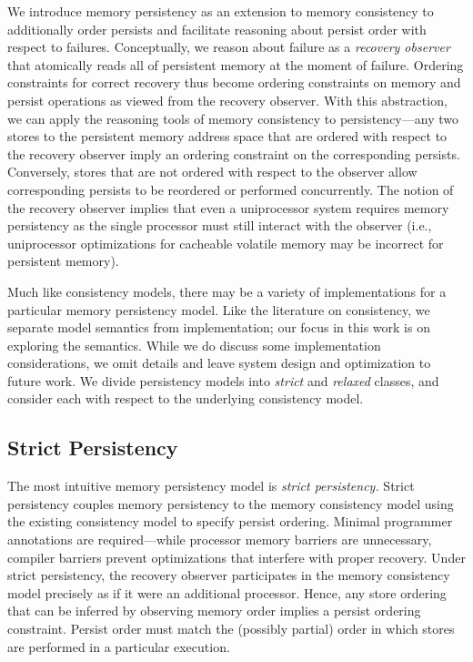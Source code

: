 We introduce memory persistency as an extension to memory consistency to additionally order persists and facilitate reasoning about persist order with respect to failures.
Conceptually, we reason about failure as a \emph{recovery observer} that atomically reads all of persistent memory at the moment of failure.
Ordering constraints for correct recovery thus become ordering constraints on memory and persist operations as viewed from the recovery observer.
With this abstraction, we can apply the reasoning tools of memory consistency to persistency---any two stores to the persistent memory address space that are ordered with respect to the recovery observer imply an ordering constraint on the corresponding persists.
Conversely, stores that are not ordered with respect to the observer allow corresponding persists to be reordered or performed concurrently.
The notion of the recovery observer implies that even a uniprocessor system requires memory persistency as the single processor must still interact with the observer (i.e., uniprocessor optimizations for cacheable volatile memory may be incorrect for persistent memory).

Much like consistency models, there may be a variety of implementations for a particular memory persistency model.
Like the literature on consistency, we separate model semantics from implementation; our focus in this work is on exploring the semantics.
While we do discuss some implementation considerations, we omit details and leave system design and optimization to future work.
We divide persistency models into \emph{strict} and \emph{relaxed} classes, and consider each with respect to the underlying consistency model.

\subsection{Strict Persistency}

The most intuitive memory persistency model is \emph{strict persistency.}
Strict persistency couples memory persistency to the memory consistency model using the existing consistency model to specify persist ordering.
Minimal programmer annotations are required---while processor memory barriers are unnecessary, compiler barriers prevent optimizations that interfere with proper recovery.
Under strict persistency, the recovery observer participates in the memory consistency model precisely as if it were an additional processor.  
Hence, any store ordering that can be inferred by observing memory order implies a persist ordering constraint.
Persist order must match the (possibly partial) order in which stores are performed in a particular execution.
 
